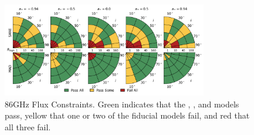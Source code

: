 
\begin{figure}
  \centering
  \includegraphics[width=0.8\textwidth]{./figures/86GHz_flux_Constraints.png}
  \caption{86GHz Flux Constraints.  Green indicates that the \kharma, \bhac, and \hamr models pass, yellow that one or two of the fiducial models fail, and red that all three fail.}
  \label{fig:86GHz_flux_pizza}
\end{figure}


